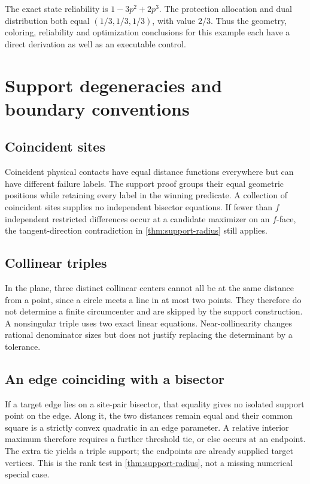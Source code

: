 The exact state reliability is $1-3p^2+2p^3$. The protection allocation and dual distribution both equal $(1/3,1/3,1/3)$, with value $2/3$. Thus the geometry, coloring, reliability and optimization conclusions for this example each have a direct derivation as well as an executable control.

\section{Support degeneracies and boundary conventions}
\label{app:support-degeneracy}
\subsection{Coincident sites}
Coincident physical contacts have equal distance functions everywhere but can have different failure labels. The support proof groups their equal geometric positions while retaining every label in the winning predicate. A collection of coincident sites supplies no independent bisector equations. If fewer than $f$ independent restricted differences occur at a candidate maximizer on an $f$-face, the tangent-direction contradiction in \cref{thm:support-radius} still applies.

\subsection{Collinear triples}
In the plane, three distinct collinear centers cannot all be at the same distance from a point, since a circle meets a line in at most two points. They therefore do not determine a finite circumcenter and are skipped by the support construction. A nonsingular triple uses two exact linear equations. Near-collinearity changes rational denominator sizes but does not justify replacing the determinant by a tolerance.

\subsection{An edge coinciding with a bisector}
If a target edge lies on a site-pair bisector, that equality gives no isolated support point on the edge. Along it, the two distances remain equal and their common square is a strictly convex quadratic in an edge parameter. A relative interior maximum therefore requires a further threshold tie, or else occurs at an endpoint. The extra tie yields a triple support; the endpoints are already supplied target vertices. This is the rank test in \cref{thm:support-radius}, not a missing numerical special case.

